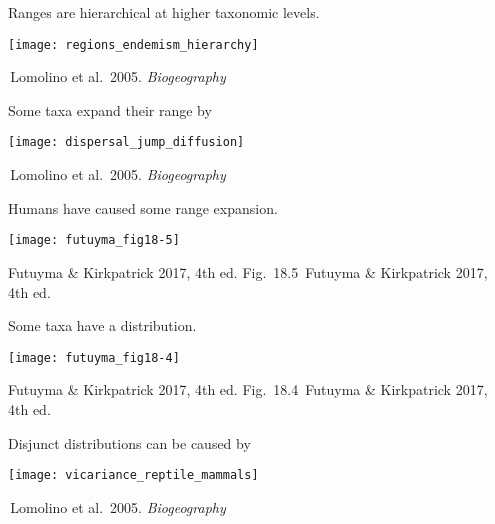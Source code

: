 \documentclass[t,handout]{beamer}  %
\newcommand{\futuyma}[1]{%
	\ifthenelse{\isempty{#1}}%
	{Futuyma \& Kirkpatrick 2017, 4th ed.}%
	{Fig.~#1~Futuyma \& Kirkpatrick 2017, 4th ed.}%
}
\newcommand{\backskip}{\vspace{-0.5\baselineskip}}
\begin{document}
\begin{frame}{Ranges are hierarchical at higher taxonomic levels.}

\backskip

\centering 

\texttt{[image: regions\_endemism\_hierarchy]}
	

\tinyfill \textcopyright\,Lomolino et al.~2005. \emph{Biogeography}


\end{frame}


%

\begin{frame}{Some taxa expand their range by }

\backskip

\centering

\texttt{[image: dispersal\_jump\_diffusion]}
	

\tinyfill \textcopyright\,Lomolino et al.~2005. \emph{Biogeography}

\end{frame}


\begin{frame}{Humans have caused some range expansion.}

\backskip

\centering

\texttt{[image: futuyma\_fig18-5]}
	

\tinyfill \futuyma{18.5}

\end{frame}


\begin{frame}{Some taxa have a  distribution.}

\backskip

\centering

\texttt{[image: futuyma\_fig18-4]}
	

\tinyfill \futuyma{18.4}

\end{frame}

\begin{frame}{Disjunct distributions can be caused by }

\backskip

\centering

\texttt{[image: vicariance\_reptile\_mammals]}
	

\tinyfill \textcopyright\,Lomolino et al.~2005. \emph{Biogeography}

\end{frame}
\end{document}
